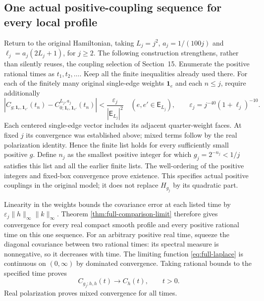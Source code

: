 \subsection{One actual positive-coupling sequence for every local profile}

Return to the original Hamiltonian, taking
$L_j=j^2$, $a_j=1/(100j)$ and $\ell_j=a_j(2L_j+1)$, for $j\ge2$.
The following construction strengthens, rather than silently reuses,
the coupling selection of Section~15. Enumerate the positive rational
times as $t_1,t_2,\ldots$. Keep all the finite inequalities already
used there. For each of the finitely many original single-edge
weights $\mathbf1_e$ and each $n\le j$, require additionally
\begin{equation}\label{eq:full-diagonal-selection}
 \left|C_{g;\mathbf1_e,\mathbf1_{e'}}(t_n)
       -C_{0;\mathbf1_e,\mathbf1_{e'}}^{L_j,a_j}(t_n)\right|
       <\frac{\varepsilon_j}{|\mathsf E_{L_j}|^2}
 \quad(e,e'\in\mathsf E_{L_j}),\qquad
 \varepsilon_j=j^{-40}(1+\ell_j)^{-10}.
\end{equation}
Each centered single-edge vector includes its adjacent quarter-weight
faces. At fixed $j$ its convergence was established above; mixed
terms follow by the real polarization identity. Hence the finite
list holds for every sufficiently small positive $g$. Define $n_j$
as the smallest positive integer for which $g_j=2^{-n_j}<1/j$
satisfies this list and all the earlier finite lists. The well-ordering
of the positive integers and fixed-box convergence prove existence.
This specifies actual positive couplings in the original model;
it does not replace $H_{g_j}$ by its quadratic part.

Linearity in the weights bounds the covariance error at each listed
time by $\varepsilon_j\|h\|_\infty\|k\|_\infty$. Theorem
\ref{thm:full-comparison-limit} therefore gives convergence for
every real compact smooth profile and every positive rational time
on this one sequence. For an arbitrary positive real time, squeeze
the diagonal covariance between two rational times: its spectral
measure is nonnegative, so it decreases with time. The limiting
function \eqref{eq:full-laplace} is continuous on $(0,\infty)$
by dominated convergence. Taking rational bounds to the specified
time proves
\begin{equation}\label{eq:full-actual-convergence}
 C_{g_j;h,h}(t)\longrightarrow C_h(t),\qquad t>0.
\end{equation}
Real polarization proves mixed convergence for all times.

